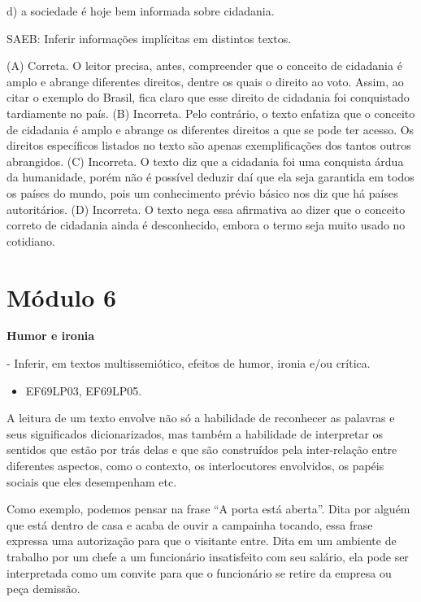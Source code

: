 d) a sociedade é hoje bem informada sobre cidadania.

SAEB: Inferir informações implícitas em distintos textos.

(A) Correta. O leitor precisa, antes, compreender que o conceito de
cidadania é amplo e abrange diferentes direitos, dentre os quais o
direito ao voto. Assim, ao citar o exemplo do Brasil, fica claro que
esse direito de cidadania foi conquistado tardiamente no país. (B)
Incorreta. Pelo contrário, o texto enfatiza que o conceito de cidadania
é amplo e abrange os diferentes direitos a que se pode ter acesso. Os
direitos específicos listados no texto são apenas exemplificações dos
tantos outros abrangidos. (C) Incorreta. O texto diz que a cidadania foi
uma conquista árdua da humanidade, porém não é possível deduzir daí que
ela seja garantida em todos os países do mundo, pois um conhecimento
prévio básico nos diz que há países autoritários. (D) Incorreta. O texto
nega essa afirmativa ao dizer que o conceito correto de cidadania ainda
é desconhecido, embora o termo seja muito usado no cotidiano.


\section{Módulo 6}

\textbf{Humor e ironia}

 - Inferir, em textos multissemiótico,
efeitos de humor, ironia e/ou crítica.


\begin{itemize}
\tightlist
\item
  EF69LP03, EF69LP05.
\end{itemize}

A leitura de um texto envolve não só a habilidade de reconhecer as
palavras e seus significados dicionarizados, mas também a habilidade de
interpretar os sentidos que estão por trás delas e que são construídos
pela inter-relação entre diferentes aspectos, como o contexto, os
interlocutores envolvidos, os papéis sociais que eles desempenham etc.

Como exemplo, podemos pensar na frase ``A porta está aberta''. Dita por
alguém que está dentro de casa e acaba de ouvir a campainha tocando,
essa frase expressa uma autorização para que o visitante entre. Dita em
um ambiente de trabalho por um chefe a um funcionário insatisfeito com
seu salário, ela pode ser interpretada como um convite para que o
funcionário se retire da empresa ou peça demissão.

